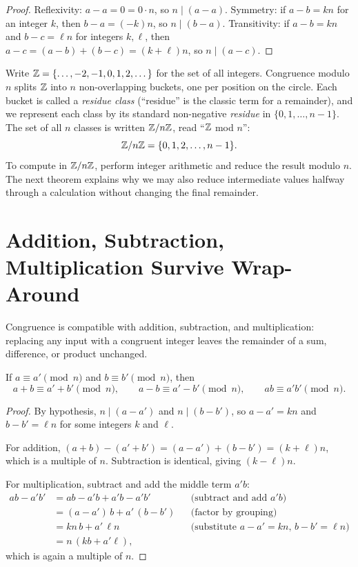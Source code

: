 \begin{proof}
Reflexivity: $a - a = 0 = 0\cdot n$, so $n \mid (a-a)$. Symmetry: if $a - b = kn$ for an integer $k$, then $b - a = (-k)n$, so $n \mid (b-a)$. Transitivity: if $a - b = kn$ and $b - c = \ell n$ for integers $k, \ell$, then $a - c = (a-b) + (b-c) = (k+\ell)n$, so $n \mid (a-c)$.
\end{proof}

Write $\mathbb{Z} = \{\dots, -2, -1, 0, 1, 2, \dots\}$ for the set of all integers. Congruence modulo $n$ splits $\mathbb{Z}$ into $n$ non-overlapping buckets, one per position on the circle. Each bucket is called a \emph{residue class} (``residue'' is the classic term for a remainder), and we represent each class by its standard non-negative \emph{residue} in $\{0, 1, \dots, n-1\}$. The set of all $n$ classes is written $\mathbb{Z}/n\mathbb{Z}$, read ``$\mathbb{Z}$ mod $n$'':
\[
  \mathbb{Z}/n\mathbb{Z} = \{0, 1, 2, \dots, n-1\}.
\]
To compute in $\mathbb{Z}/n\mathbb{Z}$, perform integer arithmetic and reduce the result modulo $n$. The next theorem explains why we may also reduce intermediate values halfway through a calculation without changing the final remainder.

\section{Addition, Subtraction, Multiplication Survive Wrap-Around}

Congruence is compatible with addition, subtraction, and multiplication: replacing any input with a congruent integer leaves the remainder of a sum, difference, or product unchanged.

\begin{theorem}
\label{ch03:compatible}
If $a \equiv a' \pmod{n}$ and $b \equiv b' \pmod{n}$, then
\[
  a + b \equiv a' + b' \pmod{n},
  \qquad
  a - b \equiv a' - b' \pmod{n},
  \qquad
  a b \equiv a' b' \pmod{n}.
\]
\end{theorem}

\begin{proof}
By hypothesis, $n \mid (a - a')$ and $n \mid (b - b')$, so $a - a' = kn$ and $b - b' = \ell n$ for some integers $k$ and $\ell$.

For addition, $(a+b) - (a'+b') = (a-a') + (b-b') = (k+\ell)n$, which is a multiple of $n$. Subtraction is identical, giving $(k-\ell)n$.

For multiplication, subtract and add the middle term $a'b$:
\begin{align*}
  ab - a'b' &= ab - a'b + a'b - a'b' && \text{(subtract and add $a'b$)} \\
            &= (a - a')\,b + a'\,(b - b') && \text{(factor by grouping)} \\
            &= kn\,b + a'\,\ell n && \text{(substitute $a-a'=kn$, $b-b'=\ell n$)} \\
            &= n\,(kb + a'\ell),
\end{align*}
which is again a multiple of $n$.
\end{proof}

